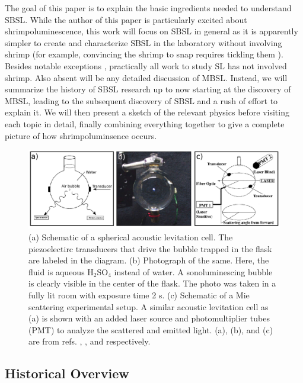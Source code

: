 \documentclass[rmp,aps,nofootinbib,superscriptaddress,floatfix]{revtex4-2}
\begin{document}
The goal of this paper is to explain the basic ingredients needed to understand SBSL. While the author of this paper is particularly excited about shrimpoluminescence, this work will focus on SBSL in general as it is apparently simpler to create and characterize SBSL in the laboratory without involving shrimp (for example, convincing the shrimp to snap requires tickling them \cite{lohse2001snapping,versluis2000snapping,lohse2018bubble}). Besides notable exceptions \cite{tang2019bioinspired}, practically all work to study SL has not involved shrimp. Also absent will be any detailed discussion of MBSL. Instead, we will summarize the history of SBSL research up to now starting at the discovery of MBSL, leading to the subsequent discovery of SBSL and a rush of effort to explain it. We will then present a sketch of the relevant physics before visiting each topic in detail, finally combining everything together to give a complete picture of how shrimpoluminsence occurs.  

\begin{figure}
\includegraphics[width=0.95\linewidth]{figs/flask.pdf}
    \caption{(a) Schematic of a spherical acoustic levitation cell. The piezoelectirc transducers that drive the bubble trapped in the flask are labeled in the diagram. (b) Photograph of the same. Here, the fluid is aqueous H$_2$SO$_4$ instead of water. A sonoluminescing bubble is clearly visible in the center of the flask. The photo was taken in a fully lit room with exposure time 2 s. (c) Schematic of a Mie scattering experimental setup. A similar acoustic levitation cell as (a) is shown with an added laser source and photomultiplier tubes (PMT) to analyze the scattered and emitted light. (a), (b), and (c) are from refs. \cite{brenner2002single}, \cite{suslick2008inside}, and \cite{gompf2000mie} respectively.}
\label{fig:flask}
\end{figure}

\subsection{Historical Overview}
\end{document}
